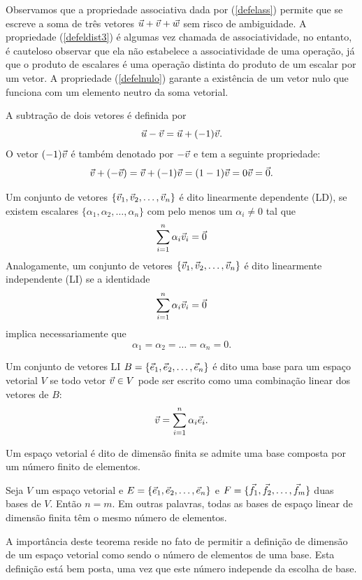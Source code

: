 Observamos que a propriedade associativa dada por (\ref{defelass}) permite que se escreve a soma de três vetores $\vec{u}+\vec{v}+\vec{w}$ sem risco de ambiguidade. A propriedade (\ref{defeldist3}) é algumas vez chamada de associatividade, no entanto, é cauteloso observar que ela não estabelece a associatividade de uma operação, já que o produto de escalares é uma operação distinta do produto de um escalar por um vetor. A propriedade (\ref{defelnulo}) garante a existência de um vetor nulo que funciona com um elemento neutro da soma vetorial. 

A subtração de dois vetores é definida por
\begin{equation}\label{delsub}
\vec{u}-\vec{v}=\vec{u}+ (-1) \vec{v}.
\end{equation}
O vetor $(-1) \vec{v}$ é também denotado por $-\vec{v}$ e tem a seguinte propriedade:
\begin{equation}\label{delinvad}
\vec{v}+(-\vec{v})=\vec{v}+(-1) \vec{v} = (1-1)\vec{v}=0\vec{v}=\vec{0}.
\end{equation}

Um conjunto de vetores $\{\vec{v}_1, \vec{v}_2,\ldots, \vec{v}_n\}$ é dito linearmente dependente (LD), se existem escalares $\{\alpha_1,\alpha_2,\ldots, \alpha_n\}$ com pelo menos um $\alpha_i\neq 0$ tal que
$$\sum_{i=1}^n\alpha_i \vec{v}_i=\vec{0}$$ 
Analogamente, um conjunto de vetores $\{\vec{v}_1, \vec{v}_2,\ldots, \vec{v}_n\}$ é dito linearmente independente (LI) se a identidade 
$$\sum_{i=1}^n\alpha_i \vec{v}_i=\vec{0}$$ 
implica necessariamente que
$$\alpha_1=\alpha_2=\ldots=\alpha_n=0.$$

Um conjunto de vetores LI $B=\{\vec{e}_1, \vec{e}_2,\ldots, \vec{e}_n\}$ é dito uma base para um espaço vetorial $V$ se todo vetor $\vec{v}\in V$ pode ser escrito como uma combinação linear dos vetores de $B$:
$$\vec{v}=\sum_{i=1}^n \alpha_i \vec{e}_i.$$ 

Um espaço vetorial é dito de dimensão finita se admite uma base composta por um número finito de elementos.

\begin{teo}\label{teo_dim} Seja $V$ um espaço vetorial e $E=\{\vec{e}_1, \vec{e}_2,\ldots, \vec{e}_n\}$ e $F=\{\vec{f}_1, \vec{f}_2,\ldots, \vec{f}_m\}$ duas bases de $V$. Então $n=m$. Em outras palavras, todas as bases de espaço linear de dimensão finita têm o mesmo número de elementos.
 \end{teo}

A importância deste teorema reside no fato de permitir a definição de dimensão de um espaço vetorial como sendo o número de elementos de uma base. Esta definição está bem posta, uma vez que este número independe da escolha de base.

